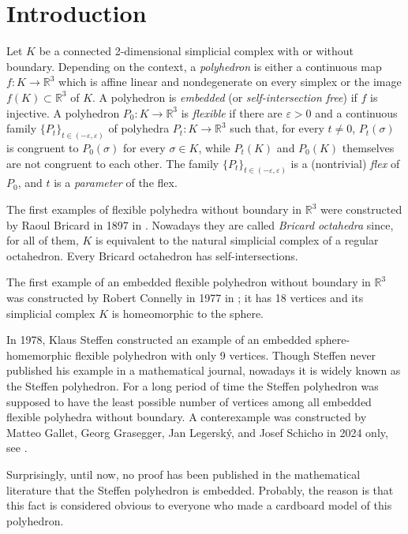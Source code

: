 \documentclass[12pt, reqno]{amsart}
\begin{document}
\section{Introduction}\label{sec1}
Let 
$K$ 
be a connected 2-dimensional simplicial complex with or without boundary.
Depending on the context, a \textit{polyhedron} is either a continuous map 
$f: K\to\mathbb{R}^3$ 
which is affine linear and nondegenerate on every simplex or the image  
$f(K)\subset\mathbb{R}^3$ 
of 
$K$. 
A polyhedron is \textit{embedded} (or \textit{self-intersection free}) if 
$f$ 
is injective.
A polyhedron 
$P_0:K\to\mathbb{R}^3$ 
is \textit{flexible} if there are
$\varepsilon>0$ 
and a continuous family 
$\{P_t \}_{t\in(-\varepsilon,\varepsilon)}$ 
of polyhedra 
$P_t: K\to\mathbb{R}^3$ 
such that,
for every 
$t\neq 0$, $P_t(\sigma)$ 
is congruent to  
$P_0(\sigma)$ 
for every  
$\sigma\in K$, 
while 
$P_t(K)$ 
and 
$P_0(K)$ 
themselves are not congruent to each other.
The family 
$\{P_t\}_{t\in (-\varepsilon, \varepsilon)}$ 
is a (nontrivial) \textit{flex} of
$P_0$, 
and 
$t$ 
is a \textit{parameter} of the flex.

The first examples of flexible polyhedra without boundary in 
$\mathbb{R}^3$ 
were constructed by Raoul Bricard in 1897 in \cite{Br97}. 
Nowadays they are called \textit{Bricard octahedra} since, for all of them,
$K$ 
is equivalent to the natural simplicial complex of a regular octahedron. 
Every Bricard octahedron has self-intersections.

The first example of an embedded flexible polyhedron without boundary in 
$\mathbb{R}^3$ 
was constructed by Robert Connelly in 1977 in \cite{Co77}; 
it has 18 vertices and its simplicial complex 
$K$ 
is homeomorphic to the sphere.

In 1978, Klaus Steffen constructed an example of an embedded sphere-homemorphic
flexible polyhedron with only 9 vertices.
Though Steffen never published his example in a mathematical journal, nowadays
it is widely known as the Steffen polyhedron.
For a long period of time the Steffen polyhedron was supposed to have 
the least possible number of vertices among all embedded flexible polyhedra
without boundary.
A conterexample was constructed by Matteo Gallet, Georg Grasegger, Jan Legersk{\'y}, 
and Josef Schicho in 2024 only, see \cite{GGLS24}.

Surprisingly, until now, no proof has been published in the mathematical literature 
that the Steffen polyhedron is embedded.
Probably, the reason is that this fact is considered obvious to everyone who made a
cardboard model of this polyhedron. 
\end{document}
